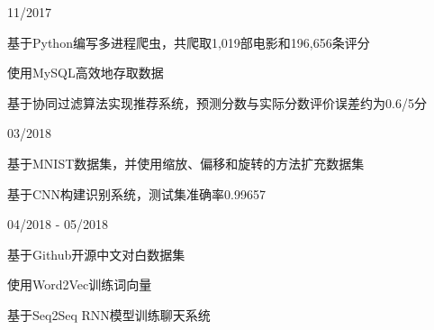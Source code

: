 
\begin{cventries}

\cvexperience
{}
{11/2017}
{
    \begin{cvitems}
    \item {基于Python编写多进程爬虫，共爬取1,019部电影和196,656条评分}
    \item {使用MySQL高效地存取数据}
    \item {基于协同过滤算法实现推荐系统，预测分数与实际分数评价误差约为0.6/5分}
    \end{cvitems}
}

\cvexperience
{}
{03/2018}
{
    \begin{cvitems}
    \item {基于MNIST数据集，并使用缩放、偏移和旋转的方法扩充数据集}
    \item {基于CNN构建识别系统，测试集准确率0.99657}
    \end{cvitems}
}

\cvexperience
{}
{04/2018 - 05/2018}
{
    \begin{cvitems}
    \item {基于Github开源中文对白数据集}
    \item {使用Word2Vec训练词向量}
    \item {基于Seq2Seq RNN模型训练聊天系统}
    \end{cvitems}
}

\end{cventries}